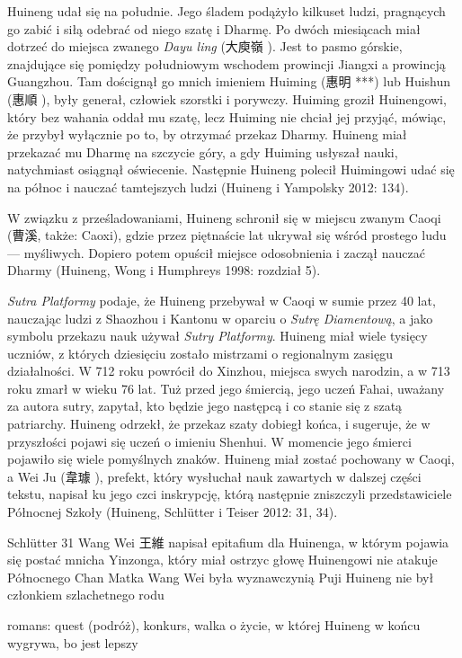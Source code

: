Huineng udał się na południe. Jego śladem podążyło kilkuset ludzi, pragnących go zabić i siłą odebrać od niego szatę i Dharmę. Po dwóch miesiącach miał dotrzeć do miejsca zwanego \textit{Dayu ling} (大庾嶺 ). Jest to pasmo górskie, znajdujące się pomiędzy południowym wschodem prowincji Jiangxi a prowincją Guangzhou. Tam doścignął go mnich imieniem Huiming (惠明 ***) lub Huishun (惠順 ), były generał, człowiek szorstki i porywczy. Huiming groził Huinengowi, który bez wahania oddał mu szatę, lecz Huiming nie chciał jej przyjąć, mówiąc, że przybył wyłącznie po to, by otrzymać przekaz Dharmy. Huineng miał przekazać mu Dharmę na szczycie góry, a gdy Huiming usłyszał nauki, natychmiast osiągnął oświecenie. Następnie Huineng polecił Huimingowi udać się na północ i nauczać tamtejszych ludzi (Huineng i Yampolsky 2012: 134).

W związku z prześladowaniami, Huineng schronił się w miejscu zwanym Caoqi (曹溪, także: Caoxi), gdzie przez piętnaście lat ukrywał się wśród prostego ludu --- myśliwych. Dopiero potem opuścił miejsce odosobnienia i zaczął nauczać Dharmy (Huineng, Wong i Humphreys 1998: rozdział 5).

\textit{Sutra Platformy} podaje, że Huineng przebywał w Caoqi w sumie przez 40 lat, nauczając ludzi z Shaozhou i Kantonu w oparciu o \textit{Sutrę Diamentową}, a jako symbolu przekazu nauk używał \textit{Sutry Platformy}. Huineng miał wiele tysięcy uczniów, z których dziesięciu zostało mistrzami o regionalnym zasięgu działalności. W 712 roku powrócił do Xinzhou, miejsca swych narodzin, a w 713 roku zmarł w wieku 76 lat. Tuż przed jego śmiercią, jego uczeń Fahai, uważany za autora sutry, zapytał, kto będzie jego następcą i co stanie się z szatą patriarchy. Huineng odrzekł, że przekaz szaty dobiegł końca, i sugeruje, że w przyszłości pojawi się uczeń o imieniu Shenhui. W momencie jego śmierci pojawiło się wiele pomyślnych znaków. Huineng miał zostać pochowany w Caoqi, a Wei Ju (韋璩 ), prefekt, który wysłuchał nauk zawartych w dalszej części tekstu, napisał ku jego czci inskrypcję, którą następnie zniszczyli przedstawiciele Północnej Szkoły (Huineng, Schlütter i Teiser 2012: 31, 34).

Schlütter 31
Wang Wei 王維 napisał epitafium dla Huinenga, w którym pojawia się postać mnicha Yinzonga, który miał ostrzyc głowę Huinengowi
nie atakuje Północnego Chan
Matka Wang Wei była wyznawczynią Puji
Huineng nie był członkiem szlachetnego rodu

romans: quest (podróż), konkurs, walka o życie, w której Huineng w końcu wygrywa, bo jest lepszy

